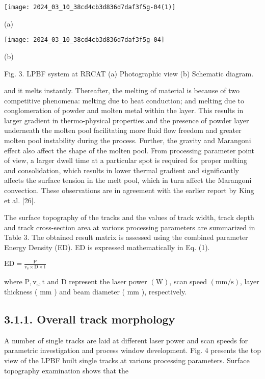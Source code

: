\documentclass[10pt]{article}
\begin{document}
\begin{center}
\texttt{[image: 2024\_03\_10\_38cd4cb3d836d7daf3f5g-04(1)]}
\end{center}

(a)

\begin{center}
\texttt{[image: 2024\_03\_10\_38cd4cb3d836d7daf3f5g-04]}
\end{center}

(b)

Fig. 3. LPBF system at RRCAT (a) Photographic view (b) Schematic diagram.

and it melts instantly. Thereafter, the melting of material is because of two competitive phenomena: melting due to heat conduction; and melting due to conglomeration of powder and molten metal within the layer. This results in larger gradient in thermo-physical properties and the presence of powder layer underneath the molten pool facilitating more fluid flow freedom and greater molten pool instability during the process. Further, the gravity and Marangoni effect also affect the shape of the molten pool. From processing parameter point of view, a larger dwell time at a particular spot is required for proper melting and consolidation, which results in lower thermal gradient and significantly affects the surface tension in the melt pool, which in turn affect the Marangoni convection. These observations are in agreement with the earlier report by King et al. [26].

The surface topography of the tracks and the values of track width, track depth and track cross-section area at various processing parameters are summarized in Table 3. The obtained result matrix is assessed using the combined parameter Energy Density (ED). ED is expressed mathematically in Eq. (1).

$\mathrm{ED}=\frac{\mathrm{P}}{\mathrm{v}_{\mathrm{s}} \times \mathrm{D} \times \mathrm{t}}$

where $\mathrm{P}, \mathrm{v}_{\mathrm{s}}, \mathrm{t}$ and $\mathrm{D}$ represent the laser power $(\mathrm{W})$, scan speed $(\mathrm{mm} / \mathrm{s})$, layer thickness ( $\mathrm{mm}$ ) and beam diameter ( $\mathrm{mm}$ ), respectively.

\subsection*{3.1.1. Overall track morphology}
A number of single tracks are laid at different laser power and scan speeds for parametric investigation and process window development. Fig. 4 presents the top view of the LPBF built single tracks at various processing parameters. Surface topography examination shows that the
\end{document}
